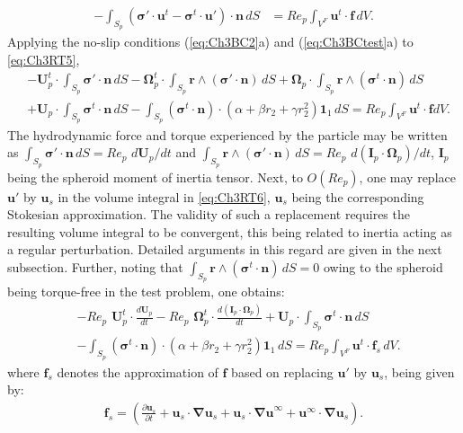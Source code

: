 \documentclass{jfm}
\begin{document}
\begin{align}
-\int_{S_p} (\bm{\sigma}'\cdot \bm{u}^t-\bm{\sigma}^t\cdot \bm{u}')\cdot \bm{n}\,dS &=Re_p\int_{V^F}\bm{u}^t\cdot\bm{f}\,dV. \label{eq:Ch3RT5}
\end{align}
Applying the no-slip conditions (\ref{eq:Ch3BC2}a) and (\ref{eq:Ch3BCtest}a)  to \eqref{eq:Ch3RT5},
\begin{align}
&-\bm{U}_p^t\cdot\int_{S_p} \bm{\sigma}'\cdot \bm{n}\,dS -\bm{\Omega}_p^t\cdot\int_{S_p}\bm{r}\wedge(\bm{\sigma}'\cdot\bm{n})\,dS + \bm{\Omega}_p\cdot\int_{S_p} \bm{r}\wedge(\bm{\sigma}^t\cdot\bm{n})\,dS\nonumber\\ 
&+\bm{U}_p\cdot\int_{S_p} \bm{\sigma}^t\cdot \bm{n}\,dS-\int_{S_p} (\bm{\sigma}^t\cdot \bm{n})\cdot(\alpha+\beta r_2+\gamma r_2^2)\bm{1}_1\,dS=Re_p\int_{V^F}\bm{u}^t\cdot\bm{f} dV. \label{eq:Ch3RT6}
\end{align}
The hydrodynamic force and torque experienced by the particle may be written as $\int_{S_p} \bm{\sigma}'\cdot \bm{n}\,dS=Re_p\,\, d\bm{U}_p/dt$ and $\int_{S_p} \bm{r}\wedge (\bm{\sigma}'\cdot\bm{n})\,dS=Re_p\,\, d(\bm{I}_p\cdot\bm{\Omega}_p)/dt$, $\bm{I}_p$ being the spheroid moment of inertia tensor. Next, to $O(Re_p)$, one may replace $\bm{u}'$ by $\bm{u}_s$ in the volume integral in \eqref{eq:Ch3RT6}, $\bm{u}_s$ being the corresponding Stokesian approximation. The validity of such a replacement requires the resulting volume integral to be convergent, this being related to inertia acting as a regular perturbation. Detailed arguments in this regard are given in the next subsection. Further, noting that $\int_{S_p} \bm{r}\wedge(\bm{\sigma}^t\cdot \bm{n})\,dS = 0$ owing to the spheroid being torque-free in the test problem, one obtains:
\begin{align}
&-Re_p\,\,\bm{U}_p^t\cdot \frac{d\bm{U}_p}{dt} -Re_p\,\,\bm{\Omega}_p^t\cdot\frac{d(\bm{I}_p\cdot\bm{\Omega}_p)}{dt}+\bm{U}_p\cdot\int_{S_p} \bm{\sigma}^t\cdot \bm{n}\,dS\nonumber\\
&-\int_{S_p} (\bm{\sigma}^t\cdot \bm{n})\cdot(\alpha+\beta r_2+\gamma r_2^2)\bm{1}_1\,dS=Re_p\int_{V^F}\bm{u}^t\cdot\bm{f}_s\,dV. \label{eq:Ch3RT7}
\end{align}
where $\bm{f}_s$ denotes the  approximation of $\bm{f}$ based on replacing $\bm{u}'$ by $\bm{u}_s$, being given by:
\begin{align}
\bm{f}_s=\left(\frac{\partial\bm{u}_s}{\partial t}+\bm{u}_s\cdot\bm{\nabla u}_s+\bm{u}_s\cdot\bm{\nabla u}^\infty+\bm{u}^\infty\cdot\bm{\nabla u}_s\right).
\end{align}
\end{document}
